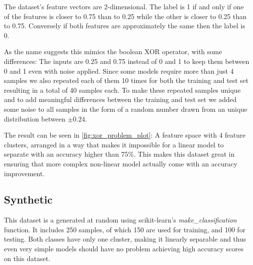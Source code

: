 The dataset's feature vectors are 2-dimensional. The label is 1 if and only if one of the features is closer to 0.75 than to 0.25 while the other is closer to 0.25 than to 0.75. Conversely if both features are approximately the same then the label is 0.

As the name suggests this mimics the boolean XOR operator, with some differences: The inputs are 0.25 and 0.75 instead of 0 and 1 to keep them between 0 and 1 even with noise applied. Since some models require more than just 4 samples we also repeated each of them 10 times for both the training and test set resulting in a total of 40 samples each. To make these repeated samples unique and to add meaningful differences between the training and test set we added some noise to all samples in the form of a random number drawn from an unique distribution between $\pm 0.24$.

The result can be seen in \ref{fig:xor_problem_plot}: A feature space with 4 feature clusters, arranged in a way that makes it impossible for a linear model to separate with an accuracy higher than 75\%. This makes this dataset great in ensuring that more complex non-linear model actually come with an accuracy improvement.

\subsection{Synthetic}

This dataset is a generated at random using scikit-learn's \emph{make\_classification} function. It includes 250 samples, of which 150 are used for training, and 100 for testing. Both classes have only one cluster, making it linearly separable and thus even very simple models should have no problem achieving high accuracy scores on this dataset.

